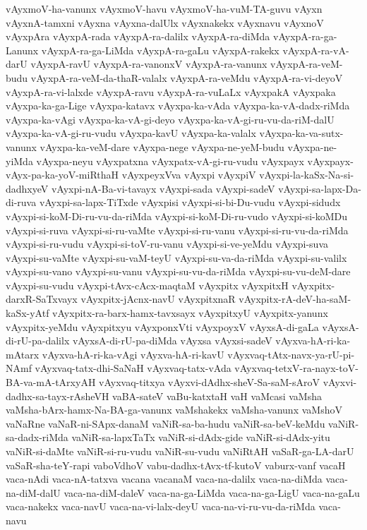 {vAyxmoV-ha-vanunx
vAyxmoV-havu
vAyxmoV-ha-vuM-TA-guvu
vAyxn
vAyxnA-tamxni
vAyxna
vAyxna-dalUlx
vAyxnakekx
vAyxnavu
vAyxnoV
vAyxpAra
vAyxpA-rada
vAyxpA-ra-dalilx
vAyxpA-ra-diMda
vAyxpA-ra-ga-Lanunx
vAyxpA-ra-ga-LiMda
vAyxpA-ra-gaLu
vAyxpA-rakekx
vAyxpA-ra-vA-darU
vAyxpA-ravU
vAyxpA-ra-vanonxV
vAyxpA-ra-vanunx
vAyxpA-ra-veM-budu
vAyxpA-ra-veM-da-thaR-valalx
vAyxpA-ra-veMdu
vAyxpA-ra-vi-deyoV
vAyxpA-ra-vi-lalxde
vAyxpA-ravu
vAyxpA-ra-vuLaLx
vAyxpakA
vAyxpaka
vAyxpa-ka-ga-Lige
vAyxpa-katavx
vAyxpa-ka-vAda
vAyxpa-ka-vA-dadx-riMda
vAyxpa-ka-vAgi
vAyxpa-ka-vA-gi-deyo
vAyxpa-ka-vA-gi-ru-vu-da-riM-dalU
vAyxpa-ka-vA-gi-ru-vudu
vAyxpa-kavU
vAyxpa-ka-valalx
vAyxpa-ka-va-sutx-vanunx
vAyxpa-ka-veM-dare
vAyxpa-nege
vAyxpa-ne-yeM-budu
vAyxpa-ne-yiMda
vAyxpa-neyu
vAyxpatxna
vAyxpatx-vA-gi-ru-vudu
vAyxpayx
vAyxpayx-vAyx-pa-ka-yoV-miRthaH
vAyxpeyxVva
vAyxpi
vAyxpiV
vAyxpi-la-kaSx-Na-si-dadhxyeV
vAyxpi-nA-Ba-vi-tavayx
vAyxpi-sada
vAyxpi-sadeV
vAyxpi-sa-lapx-Da-di-ruva
vAyxpi-sa-lapx-TiTxde
vAyxpisi
vAyxpi-si-bi-Du-vudu
vAyxpi-sidudx
vAyxpi-si-koM-Di-ru-vu-da-riMda
vAyxpi-si-koM-Di-ru-vudo
vAyxpi-si-koMDu
vAyxpi-si-ruva
vAyxpi-si-ru-vaMte
vAyxpi-si-ru-vanu
vAyxpi-si-ru-vu-da-riMda
vAyxpi-si-ru-vudu
vAyxpi-si-toV-ru-vanu
vAyxpi-si-ve-yeMdu
vAyxpi-suva
vAyxpi-su-vaMte
vAyxpi-su-vaM-teyU
vAyxpi-su-va-da-riMda
vAyxpi-su-valilx
vAyxpi-su-vano
vAyxpi-su-vanu
vAyxpi-su-vu-da-riMda
vAyxpi-su-vu-deM-dare
vAyxpi-su-vudu
vAyxpi-tAvx-cAcx-maqtaM
vAyxpitx
vAyxpitxH
vAyxpitx-darxR-SaTxvayx
vAyxpitx-jAcnx-navU
vAyxpitxnaR
vAyxpitx-rA-deV-ha-saM-kaSx-yAtf
vAyxpitx-ra-barx-hamx-tavxsayx
vAyxpitxyU
vAyxpitx-yanunx
vAyxpitx-yeMdu
vAyxpitxyu
vAyxponxVti
vAyxpoyxV
vAyxsA-di-gaLa
vAyxsA-di-rU-pa-dalilx
vAyxsA-di-rU-pa-diMda
vAyxsa
vAyxsi-sadeV
vAyxva-hA-ri-ka-mAtarx
vAyxva-hA-ri-ka-vAgi
vAyxva-hA-ri-kavU
vAyxvaq-tAtx-navx-ya-rU-pi-NAmf
vAyxvaq-tatx-dhi-SaNaH
vAyxvaq-tatx-vAda
vAyxvaq-tetxV-ra-nayx-toV-BA-va-mA-tArxyAH
vAyxvaq-titxya
vAyxvi-dAdhx-sheV-Sa-saM-sAroV
vAyxvi-dadhx-sa-tayx-rAsheVH
vaBA-sateV
vaBu-katxtaH
vaH
vaMcasi
vaMsha
vaMsha-bArx-hamx-Na-BA-ga-vanunx
vaMshakekx
vaMsha-vanunx
vaMshoV
vaNaRne
vaNaR-ni-SApx-danaM
vaNiR-sa-ba-hudu
vaNiR-sa-beV-keMdu
vaNiR-sa-dadx-riMda
vaNiR-sa-lapxTaTx
vaNiR-si-dAdx-gide
vaNiR-si-dAdx-yitu
vaNiR-si-daMte
vaNiR-si-ru-vudu
vaNiR-su-vudu
vaNiRtAH
vaSaR-ga-LA-darU
vaSaR-sha-teY-rapi
vaboVdhoV
vabu-dadhx-tAvx-tf-kutoV
vaburx-vanf
vacaH
vaca-nAdi
vaca-nA-tatxva
vacana
vacanaM
vaca-na-dalilx
vaca-na-diMda
vaca-na-diM-dalU
vaca-na-diM-daleV
vaca-na-ga-LiMda
vaca-na-ga-LigU
vaca-na-gaLu
vaca-nakekx
vaca-navU
vaca-na-vi-lalx-deyU
vaca-na-vi-ru-vu-da-riMda
vaca-navu
}
